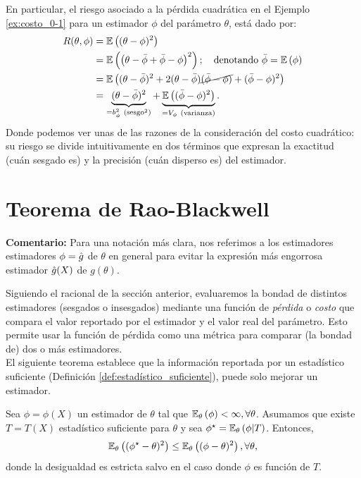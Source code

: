 En particular, el riesgo asociado a la pérdida cuadrática en el Ejemplo \ref{ex:costo_0-1} para un estimador $\phi$ del parámetro $\theta$, está dado por: 
\begin{alignat}{3}
 	R(\theta, \phi)  &= \E{(\theta - \phi)^2}\nonumber\\
 						& = \E{\left(\theta - \bar{\phi}+ \bar{\phi} -\phi\right)^2}; \quad \text{denotando }\bar{\phi} = \E{ \phi}\nonumber\\
 						& = \E{(\theta - \bar{\phi})^2+2(\theta - \bar{\phi})\cancel{(\bar{\phi} -\phi)} +  (\bar{\phi} -\phi)^2}\nonumber\\
 						& = \underbrace{(\theta - \bar{\phi})^2}_{=b_{\phi}^2\ (\text{sesgo}^2)} +  \underbrace{\E{(\bar{\phi} -\phi)^2}}_{=V_{\phi}\ \text{(varianza)}}.\label{eq:riesgo_cuad}
 \end{alignat} 
 Donde podemos ver unas de las razones de la consideración del costo cuadrático: su riesgo se divide intuitivamente en dos términos que expresan la exactitud (cuán sesgado es) y la precisión (cuán disperso es) del estimador.


\section{Teorema de Rao-Blackwell}
\textbf{Comentario:} Para una notación más clara, nos referimos  a los estimadores estimadores $\phi={ \hat{g}}$ de $\theta$ en general para evitar la expresión más engorrosa estimador ${ \hat{g}}(X)$ de $g(\theta)$.

Siguiendo el racional de la sección anterior, evaluaremos la bondad de distintos estimadores (sesgados o insesgados) mediante una función de \textit{pérdida} o \textit{costo} que compara el valor reportado por el estimador y el valor real del parámetro. Esto permite usar la función de pérdida como una métrica para comparar (la bondad de) dos o más estimadores.\\

El siguiente teorema establece que la información reportada por un estadístico suficiente (Definición \ref{def:estadístico_suficiente}), puede solo mejorar un estimador. 

\begin{theorem}
	\label{teo:rao-blackwell}
	Sea $\phi = \phi(X)$ un estimador de $\theta$ tal que $\mathbb{E}_\theta \left(\phi\right)<\infty, \forall \theta$. Asumamos que existe $T=T(X)$ estadístico suficiente para $\theta$ y sea $\phi^\star = \mathbb{E}_\theta \left(\phi|T\right)$. Entonces, 
	\begin{equation}
		\mathbb{E}_\theta \left((\phi^\star-\theta)^2\right) \leq \mathbb{E}_\theta \left((\phi-\theta)^2\right), \forall\theta,
	\end{equation}
	donde la desigualdad es estricta salvo en el caso donde $\phi$ es función de $T$.
\end{theorem}

